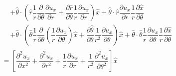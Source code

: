 \documentclass{kthreport}
\begin{document}
\begin{eqnarray}
\begin{split}
		&+ \hat{\theta}\cdot\left(	\hat{r}\dfrac{1}{r}\dfrac{\partial}{\partial \theta}\dfrac{\partial u_{x}}{\partial r}	+ \dfrac{\partial \hat{r}}{\partial \theta}\dfrac{1}{r}\dfrac{\partial u_{x}}{\partial r} \right)\hat{x} + \hat{\theta}\cdot\hat{r}\dfrac{\partial u_{x}}{\partial r}\dfrac{1}{r}\dfrac{\partial \hat{x}}{\partial \theta} \\
		&+ \hat{\theta}\cdot\left(\hat{\theta}\dfrac{1}{r}\dfrac{\partial }{\partial \theta}\left(\dfrac{1}{r}\dfrac{\partial u_{x}}{\partial \theta}\right)\hat{x}
		+ \dfrac{\partial \hat{\theta}}{\partial \theta}\dfrac{1}{r^{2}}\dfrac{\partial u_{x}}{\partial \theta} \right) \hat{x} + \hat{\theta}\cdot\hat{\theta}\dfrac{1}{r}\dfrac{\partial u_{x}}{\partial \theta}\dfrac{1}{r}\dfrac{\partial \hat{x}}{\partial \theta}
	\end{split} \nonumber \\
	= \left[\dfrac{\partial^{2}u_{x}}{\partial x^{2}} + \dfrac{\partial^{2}u_{x}}{\partial r^{2}} + \dfrac{1}{r}\dfrac{\partial u_{x}}{\partial r} + \dfrac{1}{r^{2}}\dfrac{\partial^{2} u_{x}}{\partial \theta^{2}}	\right]\hat{x}
\end{eqnarray}
\end{document}
